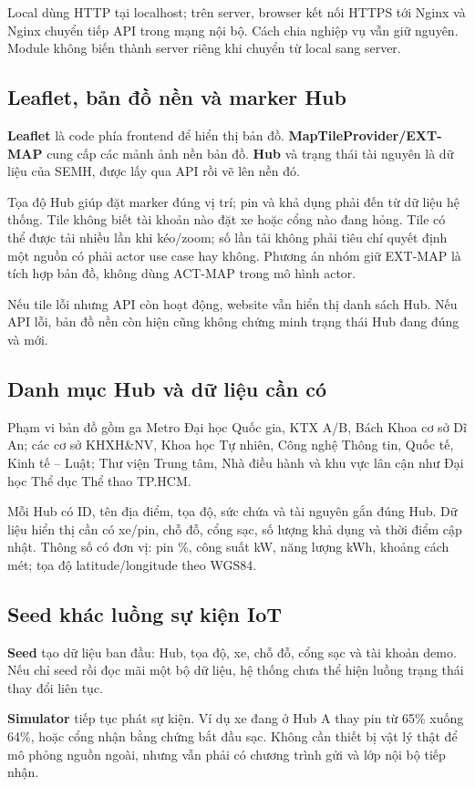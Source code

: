 \documentclass[12pt,a4paper]{article}
\newcommand{\Term}[1]{\textbf{#1}}
\begin{document}
Local dùng HTTP tại localhost; trên server, browser kết nối HTTPS tới Nginx và Nginx chuyển tiếp API trong mạng nội bộ. Cách chia nghiệp vụ vẫn giữ nguyên. Module không biến thành server riêng khi chuyển từ local sang server.

\subsection{Leaflet, bản đồ nền và marker Hub}
\Term{Leaflet} là code phía frontend để hiển thị bản đồ. \Term{MapTileProvider/EXT-MAP} cung cấp các mảnh ảnh nền bản đồ. \Term{Hub} và trạng thái tài nguyên là dữ liệu của SEMH, được lấy qua API rồi vẽ lên nền đó.

Tọa độ Hub giúp đặt marker đúng vị trí; pin và khả dụng phải đến từ dữ liệu hệ thống. Tile không biết tài khoản nào đặt xe hoặc cổng nào đang hỏng. Tile có thể được tải nhiều lần khi kéo/zoom; số lần tải không phải tiêu chí quyết định một nguồn có phải actor use case hay không. Phương án nhóm giữ EXT-MAP là tích hợp bản đồ, không dùng ACT-MAP trong mô hình actor.

Nếu tile lỗi nhưng API còn hoạt động, website vẫn hiển thị danh sách Hub. Nếu API lỗi, bản đồ nền còn hiện cũng không chứng minh trạng thái Hub đang đúng và mới.

\subsection{Danh mục Hub và dữ liệu cần có}
Phạm vi bản đồ gồm ga Metro Đại học Quốc gia, KTX A/B, Bách Khoa cơ sở Dĩ An; các cơ sở KHXH\&NV, Khoa học Tự nhiên, Công nghệ Thông tin, Quốc tế, Kinh tế -- Luật; Thư viện Trung tâm, Nhà điều hành và khu vực lân cận như Đại học Thể dục Thể thao TP.HCM.

Mỗi Hub có ID, tên địa điểm, tọa độ, sức chứa và tài nguyên gắn đúng Hub. Dữ liệu hiển thị cần có xe/pin, chỗ đỗ, cổng sạc, số lượng khả dụng và thời điểm cập nhật. Thông số có đơn vị: pin \%, công suất kW, năng lượng kWh, khoảng cách mét; tọa độ latitude/longitude theo WGS84.

\subsection{Seed khác luồng sự kiện IoT}
\Term{Seed} tạo dữ liệu ban đầu: Hub, tọa độ, xe, chỗ đỗ, cổng sạc và tài khoản demo. Nếu chỉ seed rồi đọc mãi một bộ dữ liệu, hệ thống chưa thể hiện luồng trạng thái thay đổi liên tục.

\Term{Simulator} tiếp tục phát sự kiện. Ví dụ xe đang ở Hub A thay pin từ 65\% xuống 64\%, hoặc cổng nhận bằng chứng bắt đầu sạc. Không cần thiết bị vật lý thật để mô phỏng nguồn ngoài, nhưng vẫn phải có chương trình gửi và lớp nội bộ tiếp nhận.
\end{document}
